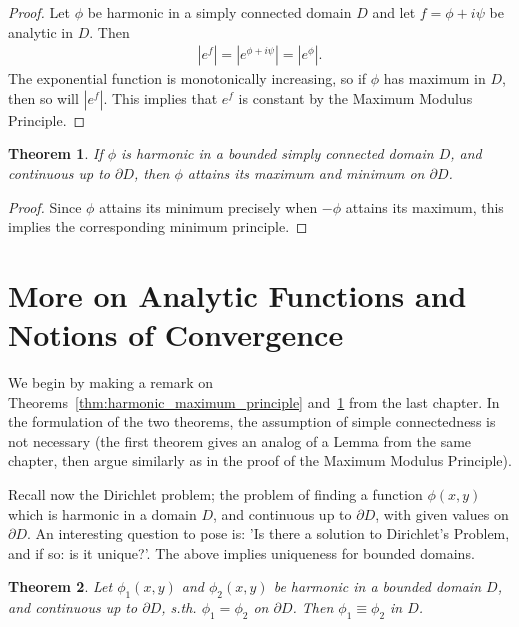 \documentclass[12pt, a4paper]{article}
\theoremstyle{plain}
\newtheorem{thm}{Theorem} %
\theoremstyle{definition}
\begin{document}
			\begin{proof}
				Let $\phi$ be harmonic in a simply connected domain $D$ and let $f=\phi+i\psi$ be analytic in $D$. Then
				\begin{align*}
					|e^f| = |e^{\phi+i\psi}| = |e^\phi|.
				\end{align*}
				The exponential function is monotonically increasing, so if $\phi$ has maximum in $D$, then so will $|e^f|$. This implies that $e^f$ is constant by the Maximum Modulus Principle.
			\end{proof}

			\begin{thm}
			\label{thm:hamonic_maximum_on_boundary}
				If $\phi$ is harmonic in a bounded simply connected domain $D$, and continuous up to $\partial D$, then $\phi$ attains its maximum and minimum on $\partial D$.
			\end{thm}

			\begin{proof}
				Since $\phi$ attains its minimum precisely when $-\phi$ attains its maximum, this implies the corresponding minimum principle.
			\end{proof}
	\section{More on Analytic Functions and Notions of Convergence} %
	\label{sec:more_on_analytic_functions_and_notions_of_convergence}
		We begin by making a remark on Theorems~\ref{thm:harmonic_maximum_principle} and~\ref{thm:hamonic_maximum_on_boundary} from the last chapter. In the formulation of the two theorems, the assumption of simple connectedness is not necessary (the first theorem gives an analog of a Lemma from the same chapter, then argue similarly as in the proof of the Maximum Modulus Principle).

		Recall now the Dirichlet problem; the problem of finding a function $\phi(x,y)$ which is harmonic in a domain $D$, and continuous up to $\partial D$, with given values on $\partial D$. An interesting question to pose is: 'Is there a solution to Dirichlet's Problem, and if so: is it unique?'. The above implies uniqueness for bounded domains.\\

		\begin{thm}
			Let $\phi_1(x,y)$ and $\phi_2(x,y)$ be harmonic in a bounded domain $D$, and continuous up to $\partial D$, s.th. $\phi_1 = \phi_2$ on $\partial D$. Then $\phi_1\equiv \phi_2$ in $D$.
		\end{thm}
\end{document}
